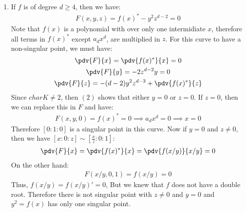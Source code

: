 \begin{enumerate}[label=]
    \item 
        If $f$ is of degree $d \ge 4$, then we have:
        \begin{gather*}
            F(x, y, z) = f(x)^* - y^2 z^{d - 2} = 0
        \end{gather*}
        Note that $f(x)$ is a polynomial with over only one intermidiate $x$, therefore all terms in $f(x)^*$ except $a_d x^d$, are multiplied in $z$.
        For this curve to have a non-singular point, we must have:
        \begin{gather}
            \pdv{F}{x} = \pdv{f(x)^*}{x} = 0 \\
            \pdv{F}{y} = -2z^{d - 2} y = 0 \\
            \pdv{F}{z} = -(d - 2) y^2 z^{d - 3} + \pdv{f(x)^*}{z} 
        \end{gather}
        Since $char K \ne 2$, then $(2)$ shows that either $y = 0$ or $z = 0$. If $z = 0$, then we can replace this in $F$ and have:
        \begin{gather*}
            F(x, y, 0) = f(x)^* = 0 \implies a_d x^d = 0 \implies x = 0
        \end{gather*}
        Therefore $[0: 1: 0]$ is a singular point in this curve. Now if $y = 0$ and $z \ne 0$, then we have $[x: 0: z] \sim  [\frac{x}{z} : 0: 1]$:
        \begin{gather*}
            \pdv{F}{x} = \pdv{f(x)^*}{x} = \pdv{f(x/y)}{x/y} = 0
        \end{gather*}
        On the other hand:
        \begin{gather*}
            F(x/y, 0, 1) = f(x/y) = 0
        \end{gather*}
        Thus, $f(x/y) = f(x/y)' = 0$, But we knew that $f$ does not have a double root. Therefore there is not singular point with $z \ne 0$ and $y = 0$ and $y^2 = f(x)$ has only one singular point.
\end{enumerate}